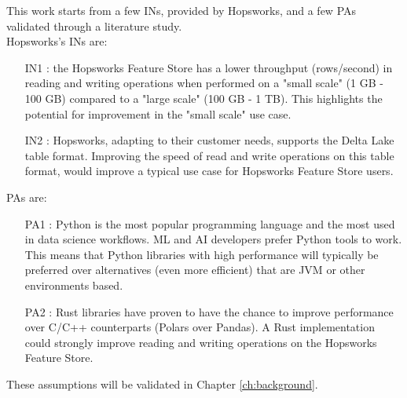 This work starts from a few \glspl{IN}, provided by Hopsworks, and a few \glspl{PA} validated through a literature study. \\ Hopsworks's \glspl{IN} are:
\begin{itemize}
    \item[IN1 :] the Hopsworks Feature Store has a lower throughput (rows/second) in reading and writing operations when performed on a "small scale" (1 GB - 100 GB) compared to a "large scale" (100 GB - 1 TB). This highlights the potential for improvement in the "small scale" use case.
    \item[IN2 :] Hopsworks, adapting to their customer needs, supports the Delta Lake table format. Improving the speed of read and write operations on this table format, would improve a typical use case for Hopsworks Feature Store users.
\end{itemize}
\glspl{PA} are:
\begin{itemize}
    \item[PA1 :] Python is the most popular programming language and the most used in data science workflows. \gls{ML} and \gls{AI} developers prefer Python tools to work. This means that Python libraries with high performance will typically be preferred over alternatives (even more efficient) that are \gls{JVM} or other environments based.
    \item[PA2 :] Rust libraries have proven to have the chance to improve performance over C/C++ counterparts (Polars over Pandas). A Rust implementation could strongly improve reading and writing operations on the Hopsworks Feature Store.
\end{itemize}
These assumptions will be validated in Chapter \ref{ch:background}. 

